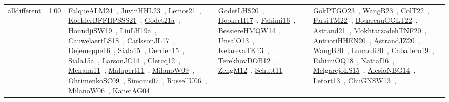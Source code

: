 {\begin{longtable}{p{3cm}r>{\raggedright\arraybackslash}p{6cm}>{\raggedright\arraybackslash}p{6cm}>{\raggedright\arraybackslash}p{8cm}}
\index{alldifferent}\index{Constraints!alldifferent}alldifferent &  1.00 & \href{../works/FalqueALM24.pdf}{FalqueALM24}~\cite{FalqueALM24}, \href{../works/JuvinHHL23.pdf}{JuvinHHL23}~\cite{JuvinHHL23}, \href{../works/Lemos21.pdf}{Lemos21}~\cite{Lemos21}, \href{../works/KoehlerBFFHPSSS21.pdf}{KoehlerBFFHPSSS21}~\cite{KoehlerBFFHPSSS21}, \href{../works/Godet21a.pdf}{Godet21a}~\cite{Godet21a}, \href{../works/HoundjiSW19.pdf}{HoundjiSW19}~\cite{HoundjiSW19}, \href{../works/LiuLH19a.pdf}{LiuLH19a}~\cite{LiuLH19a}, \href{../works/CauwelaertLS18.pdf}{CauwelaertLS18}~\cite{CauwelaertLS18}, \href{../works/CarlssonJL17.pdf}{CarlssonJL17}~\cite{CarlssonJL17}, \href{../works/Dejemeppe16.pdf}{Dejemeppe16}~\cite{Dejemeppe16}, \href{../works/Siala15.pdf}{Siala15}~\cite{Siala15}, \href{../works/Derrien15.pdf}{Derrien15}~\cite{Derrien15}, \href{../works/Siala15a.pdf}{Siala15a}~\cite{Siala15a}, \href{../works/LarsonJC14.pdf}{LarsonJC14}~\cite{LarsonJC14}, \href{../works/Clercq12.pdf}{Clercq12}~\cite{Clercq12}, \href{../works/Menana11.pdf}{Menana11}~\cite{Menana11}, \href{../works/Malapert11.pdf}{Malapert11}~\cite{Malapert11}, \href{../works/MilanoW09.pdf}{MilanoW09}~\cite{MilanoW09}, \href{../works/OhrimenkoSC09.pdf}{OhrimenkoSC09}~\cite{OhrimenkoSC09}, \href{../works/Simonis07.pdf}{Simonis07}~\cite{Simonis07}, \href{../works/RussellU06.pdf}{RussellU06}~\cite{RussellU06}, \href{../works/MilanoW06.pdf}{MilanoW06}~\cite{MilanoW06}, \href{../works/KanetAG04.pdf}{KanetAG04}~\cite{KanetAG04} & \href{../works/GodetLHS20.pdf}{GodetLHS20}~\cite{GodetLHS20}, \href{../works/HookerH17.pdf}{HookerH17}~\cite{HookerH17}, \href{../works/Fahimi16.pdf}{Fahimi16}~\cite{Fahimi16}, \href{../works/BessiereHMQW14.pdf}{BessiereHMQW14}~\cite{BessiereHMQW14}, \href{../works/UnsalO13.pdf}{UnsalO13}~\cite{UnsalO13}, \href{../works/KelarevaTK13.pdf}{KelarevaTK13}~\cite{KelarevaTK13}, \href{../works/TerekhovDOB12.pdf}{TerekhovDOB12}~\cite{TerekhovDOB12}, \href{../works/ZengM12.pdf}{ZengM12}~\cite{ZengM12}, \href{../works/Schutt11.pdf}{Schutt11}~\cite{Schutt11} & \href{../works/GokPTGO23.pdf}{GokPTGO23}~\cite{GokPTGO23}, \href{../works/WangB23.pdf}{WangB23}~\cite{WangB23}, \href{../works/ColT22.pdf}{ColT22}~\cite{ColT22}, \href{../works/FarsiTM22.pdf}{FarsiTM22}~\cite{FarsiTM22}, \href{../works/BourreauGGLT22.pdf}{BourreauGGLT22}~\cite{BourreauGGLT22}, \href{../works/Astrand21.pdf}{Astrand21}~\cite{Astrand21}, \href{../works/MokhtarzadehTNF20.pdf}{MokhtarzadehTNF20}~\cite{MokhtarzadehTNF20}, \href{../works/AntuoriHHEN20.pdf}{AntuoriHHEN20}~\cite{AntuoriHHEN20}, \href{../works/AstrandJZ20.pdf}{AstrandJZ20}~\cite{AstrandJZ20}, \href{../works/WangB20.pdf}{WangB20}~\cite{WangB20}, \href{../works/Lunardi20.pdf}{Lunardi20}~\cite{Lunardi20}, \href{../works/Caballero19.pdf}{Caballero19}~\cite{Caballero19}, \href{../works/FahimiOQ18.pdf}{FahimiOQ18}~\cite{FahimiOQ18}, \href{../works/Nattaf16.pdf}{Nattaf16}~\cite{Nattaf16}, \href{../works/MelgarejoLS15.pdf}{MelgarejoLS15}~\cite{MelgarejoLS15}, \href{../works/AlesioNBG14.pdf}{AlesioNBG14}~\cite{AlesioNBG14}, \href{../works/Letort13.pdf}{Letort13}~\cite{Letort13}, \href{../works/ChuGNSW13.pdf}{ChuGNSW13}~\cite{ChuGNSW13}, 
\end{longtable}}
